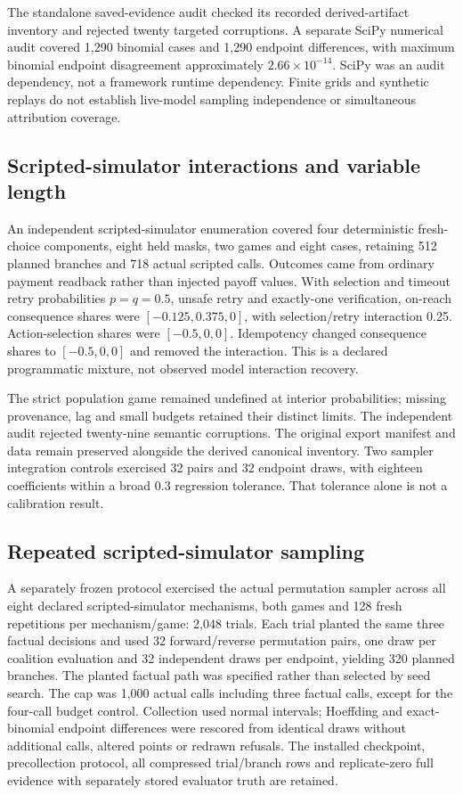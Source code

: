 \documentclass[conference]{IEEEtran}
\begin{document}
The standalone saved-evidence audit checked its recorded derived-artifact
inventory and rejected twenty targeted corruptions. A
separate SciPy numerical audit covered 1,290 binomial cases and 1,290 endpoint
differences, with maximum binomial endpoint disagreement approximately
$2.66\times10^{-14}$. SciPy was an audit dependency, not a framework runtime
dependency. Finite grids and synthetic replays do not establish live-model
sampling independence or simultaneous attribution coverage.

\subsection{Scripted-simulator interactions and variable length}
An independent scripted-simulator enumeration covered four deterministic fresh-choice
components, eight held masks, two games and eight cases, retaining 512 planned
branches and 718 actual scripted calls. Outcomes came from ordinary payment
readback rather than injected payoff values. With selection and timeout retry
probabilities $p=q=0.5$, unsafe retry and exactly-one verification, on-reach
consequence shares were $[-0.125,0.375,0]$, with selection/retry interaction
0.25. Action-selection shares were $[-0.5,0,0]$. Idempotency changed consequence
shares to $[-0.5,0,0]$ and removed the interaction. This is a declared
programmatic mixture, not observed model interaction recovery.

The strict population game remained undefined at interior probabilities;
missing provenance, lag and small budgets retained their distinct limits.
The independent audit rejected twenty-nine semantic corruptions.
The original export manifest and data remain preserved alongside
the derived canonical inventory. Two sampler integration controls exercised
32 pairs and 32 endpoint draws, with eighteen coefficients within a broad
0.3 regression tolerance. That tolerance alone is not a calibration result.

\subsection{Repeated scripted-simulator sampling}
A separately frozen protocol exercised the actual permutation sampler across
all eight declared scripted-simulator mechanisms, both games and 128 fresh repetitions
per mechanism/game: 2,048 trials. Each trial planted the same three factual
decisions and used 32 forward/reverse permutation pairs, one draw per coalition
evaluation and 32 independent draws per endpoint, yielding 320 planned branches.
The planted factual path was specified rather than selected by seed search.
The cap was 1,000 actual calls including three factual calls, except for the
four-call budget control. Collection used normal intervals; Hoeffding and
exact-binomial endpoint differences were rescored from identical draws without
additional calls, altered points or redrawn refusals. The installed checkpoint,
precollection protocol, all compressed trial/branch rows and replicate-zero
full evidence with separately stored evaluator truth are retained.
\end{document}
